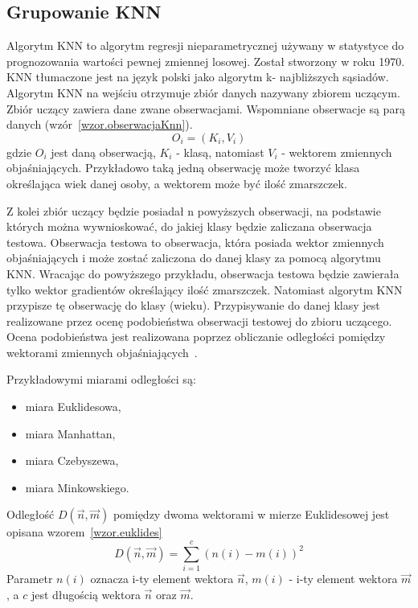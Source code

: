 \documentclass[a4paper,twoside,12pt]{book}
\begin{document}
    \subsection{Grupowanie KNN}\label{subsec:grupowanie-knn}
    Algorytm KNN to algorytm regresji
    nieparametrycznej używany w statystyce do
    prognozowania wartości pewnej zmiennej losowej. Został stworzony w roku 1970.
    KNN tłumaczone jest na język polski jako algorytm k- najbliższych sąsiadów.
    Algorytm KNN na wejściu otrzymuje zbiór danych nazywany zbiorem uczącym.
    Zbiór uczący zawiera dane zwane obserwacjami. Wspomniane obserwacje są parą danych (wzór~\ref{wzor.obserwacjaKnn}).
    \large
    \begin{equation}
        O_{i} = (K_{i}, V_{i})
        \label{wzor.obserwacjaKnn}
    \end{equation}
    \normalsize
    gdzie $O_{i}$ jest daną obserwacją, $K_{i}$ - klasą, natomiast $V_{i}$ - wektorem zmiennych objaśniających.
    Przykładowo taką jedną obserwację może tworzyć klasa określająca wiek danej osoby, a wektorem może być ilość
    zmarszczek.

    Z kolei zbiór uczący będzie posiadał n powyższych obserwacji, na podstawie których można wywnioskować, do jakiej
    klasy będzie zaliczana obserwacja testowa. Obserwacja testowa to obserwacja, która posiada wektor zmiennych
    objaśniających i może zostać zaliczona do danej klasy za pomocą algorytmu KNN.
    Wracając do powyższego przykładu, obserwacja testowa będzie zawierała tylko wektor gradientów określający ilość
    zmarszczek.
    Natomiast algorytm KNN przypisze tę obserwację do klasy (wieku).
    Przypisywanie do danej klasy jest realizowane przez ocenę podobieństwa obserwacji testowej do zbioru uczącego.
    Ocena podobieństwa jest realizowana poprzez obliczanie odległości pomiędzy wektorami zmiennych
    objaśniających~\cite{knnOpis}.

    Przykładowymi miarami odległości są:
    \begin{itemize}
        \item miara Euklidesowa,
        \item miara Manhattan,
        \item miara Czebyszewa,
        \item miara Minkowskiego.
    \end{itemize}
    Odległość $D(\overrightarrow{n},\overrightarrow{m})$ pomiędzy dwoma wektorami w mierze Euklidesowej jest opisana
    wzorem~\ref{wzor.euklides}
    \large
    \begin{equation}
        D(\overrightarrow{n},\overrightarrow{m})=\sum_{i=1}^{c}(n(i)-m(i))^{2}
        \label{wzor.euklides}
    \end{equation}
    \normalsize
    Parametr $n(i)$ oznacza i-ty element wektora $\overrightarrow{n}$,  $m(i)$ - i-ty element wektora
    $\overrightarrow{m}$, a $c$ jest długością wektora  $\overrightarrow{n}$ oraz $\overrightarrow{m}$.
\end{document}
